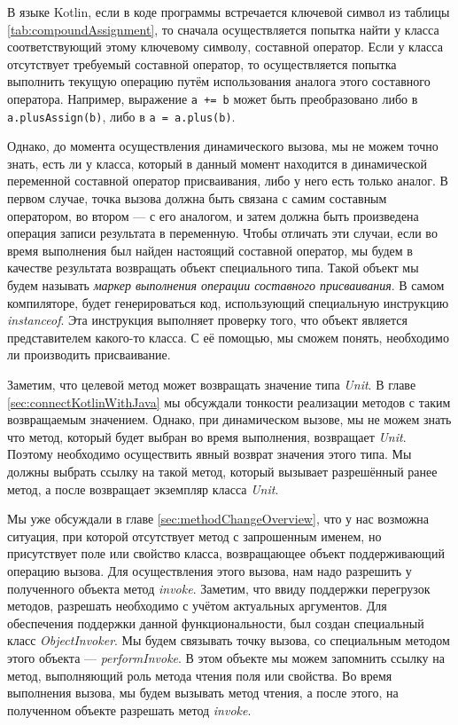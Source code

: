 
В языке Kotlin, если в коде программы встречается ключевой символ из таблицы \ref{tab:compoundAssignment}, то сначала осуществляется попытка найти у класса соответствующий этому ключевому символу, составной оператор. Если у класса отсутствует требуемый составной оператор, то осуществляется попытка выполнить текущую операцию путём использования аналога этого составного оператора. Например, выражение \texttt{a += b} может быть преобразовано либо в \texttt{a.plusAssign(b)}, либо в \texttt{a = a.plus(b)}. 

Однако, до момента осуществления динамического вызова, мы не можем точно знать, есть ли у класса, который в данный момент находится в динамической переменной составной оператор присваивания, либо у него есть только аналог. В первом случае, точка вызова должна быть связана с самим составным оператором, во втором --- с его аналогом, и затем должна быть произведена операция записи результата в переменную. Чтобы отличать эти случаи, если во время выполнения был найден настоящий составной оператор, мы будем в качестве результата возвращать объект специального типа. Такой объект мы будем называть \textit{маркер выполнения операции составного присваивания}. 
В самом компиляторе, будет генерироваться код, использующий специальную инструкцию \textit{instanceof}. Эта инструкция выполняет проверку того, что объект является представителем какого-то класса. С её помощью, мы сможем понять, необходимо ли производить присваивание.


Заметим, что целевой метод может возвращать значение типа \textit{Unit}. В главе \ref{sec:connectKotlinWithJava} мы обсуждали тонкости реализации методов с таким возвращаемым значением. Однако, при динамическом вызове, мы не можем знать что метод, который будет выбран во время выполнения, возвращает \textit{Unit}. Поэтому необходимо осуществить явный возврат значения этого типа. Мы должны выбрать ссылку на такой метод, который вызывает разрешённый ранее метод, а после возвращает экземпляр класса \textit{Unit}.

Мы уже обсуждали в главе \ref{sec:methodChangeOverview}, что у нас возможна ситуация, при которой отсутствует метод с запрошенным именем, но присутствует поле или свойство класса, возвращающее объект поддерживающий операцию вызова.
Для осуществления этого вызова, нам надо разрешить у полученного объекта метод \textit{invoke}. Заметим, что ввиду поддержки перегрузок методов, разрешать необходимо с учётом актуальных аргументов. Для обеспечения поддержки данной функциональности, был создан специальный класс \textit{ObjectInvoker}. Мы будем связывать точку вызова, со специальным методом этого объекта --- \textit{performInvoke}. В этом объекте мы можем запомнить ссылку на метод, выполняющий роль метода чтения поля или свойства. Во время выполнения вызова, мы будем вызывать метод чтения, а после этого, на полученном объекте разрешать метод \textit{invoke}.


